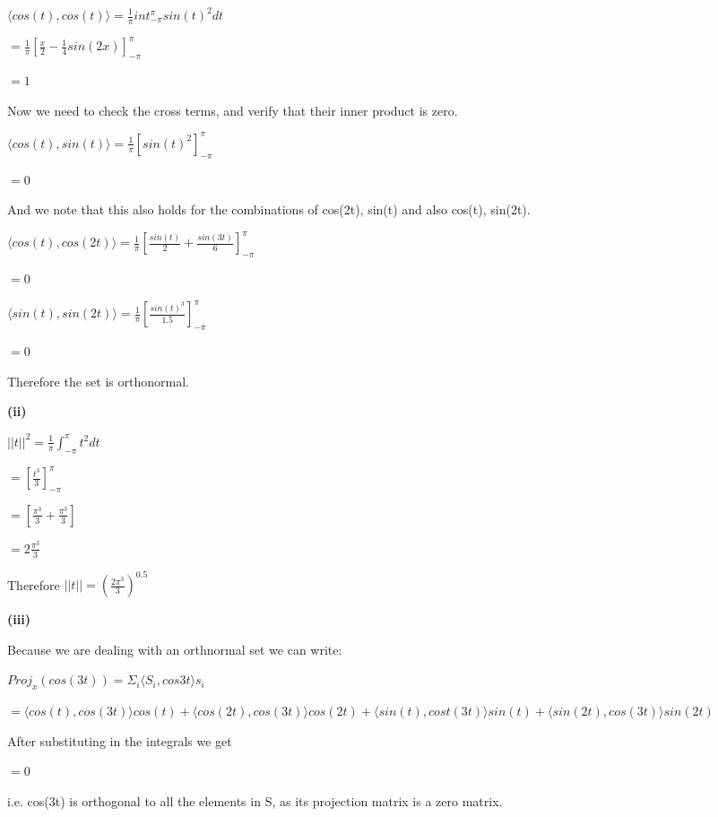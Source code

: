 \documentclass[letterpaper,12pt]{article}
\theoremstyle{definition}
\begin{document}
\begin{spacing}{1.3}{}
	$\langle cos(t), cos(t) \rangle = \frac{1}{\pi}int_{-\pi}^{\pi} sin(t)^2 dt$
	
	$= \frac{1}{\pi}[\frac{x}{2} - \frac{1}{4}sin(2x)]_{-\pi}^{\pi}$
	
	$=1$
	
	Now we need to check the cross terms, and verify that their inner product is zero.
	
	$\langle cos(t), sin(t) \rangle = \frac{1}{\pi}[sin(t)^2]_{-\pi}^{\pi}$
	
	$=0$
	
	And we note that this also holds for the combinations of cos(2t), sin(t) and also cos(t), sin(2t).
	
	$\langle cos(t), cos(2t) \rangle = \frac{1}{\pi}[\frac{sin(t)}{2} + \frac{sin(3t)}{6}]_{-\pi}^{\pi}$
	
	$=0$
	
	$\langle sin(t), sin(2t) \rangle = \frac{1}{\pi}[\frac{sin(t)^3}{1.5}]_{-\pi}^{\pi}$
	
	$=0$
	
	Therefore the set is orthonormal.
	
	\setlength{\leftskip}{10pt}
	
	\textbf{(ii)}
	
	\setlength{\leftskip}{20pt}
	
	$||t||^2 = \frac{1}{\pi}\int_{-\pi}^{\pi}t^2 dt$
	
	$= [\frac{t^3}{3}]_{-\pi}^{\pi}$
	
	$= [\frac{\pi^3}{3} + \frac{\pi^3}{3}]$
	
	$= 2\frac{\pi^3}{3}$
	
	Therefore $||t|| = (\frac{2\pi^3}{3})^{0.5}$
	
	
	\setlength{\leftskip}{10pt}
	
	\textbf{(iii)}
	
	\setlength{\leftskip}{20pt}
	
	Because we are dealing with an orthnormal set we can write:
	
	$Proj_{x}(cos(3t)) = \Sigma_{i}\langle S_i , cos{3t} \rangle s_i$
	
	$= \langle cos(t), cos(3t) \rangle cos(t) + \langle cos(2t), cos(3t) \rangle cos(2t) + \langle sin(t), cost(3t) \rangle sin(t) + \langle sin(2t), cos(3t) \rangle sin(2t)$
	
	After substituting in the integrals we get
	
	$=0$
	
	i.e. cos(3t) is orthogonal to all the elements in S, as its projection matrix is a zero matrix.
	

\end{spacing}
\end{document}
